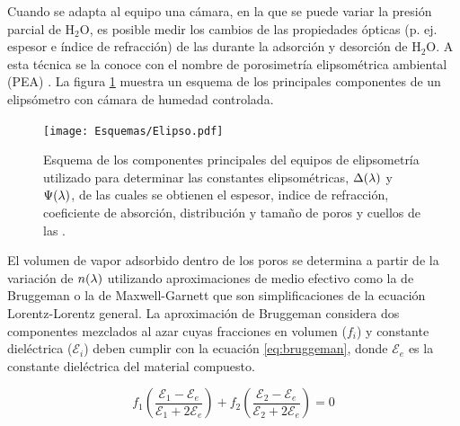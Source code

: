 		Cuando se adapta al equipo una cámara, en la que se puede variar la presión parcial de H$_2$O, es posible medir los cambios de las propiedades ópticas (p. ej. espesor e índice de refracción) de las \pdm\space durante la adsorción y desorción de H$_2$O. A esta técnica se la conoce con el nombre de porosimetría elipsométrica ambiental (PEA) \cite{Boissiere2005}. La figura \ref{fig:elipso} muestra un esquema de los principales componentes de un elipsómetro con cámara de humedad controlada.

			  \begin{figure}[h]
				\begin{center}
				\texttt{[image: Esquemas/Elipso.pdf]}
			  	\caption[Esquema de la técncia de elipsoporosimetría ambiental]{Esquema de los componentes principales del equipos de elipsometría utilizado para determinar las constantes elipsométricas, $\Delta(\lambda\index{longitud de onda})$ y $\Psi(\lambda\index{longitud de onda})$, de las cuales se obtienen el espesor, indice de refracción, coeficiente de absorción,  distribución y tamaño de poros y cuellos de las \pdm.}
			  	\label{fig:elipso}
			  	\end{center}
			  	\end{figure}
		
		El volumen de vapor adsorbido dentro de los poros se determina a partir de la variación de $n(\lambda\index{longitud de onda})$ utilizando aproximaciones de medio efectivo como la de Bruggeman\cite{Bruggeman1935} o la de Maxwell-Garnett\cite{Garnett1906} que son simplificaciones de la ecuación Lorentz-Lorentz  general\cite{TompkinsHarlandG.1999}.
		La aproximación de Bruggeman considera dos componentes mezclados al azar cuyas fracciones en volumen ($f_i$) y constante dieléctrica ($\mathcal{E}_i$) deben cumplir con la ecuación \ref{eq:bruggeman}, donde $\mathcal{E}_e$ es la constante dieléctrica del material compuesto. 
				
				\begin{equation}
				 f_1\left(\frac{\mathcal{E}_1-\mathcal{E}_e}{\mathcal{E}_1+2\mathcal{E}_e}\right)+
				 f_2\left(\frac{\mathcal{E}_2-\mathcal{E}_e}{\mathcal{E}_2+2\mathcal{E}_e}\right)=0
			     \label{eq:bruggeman}
				 \end{equation}
		
